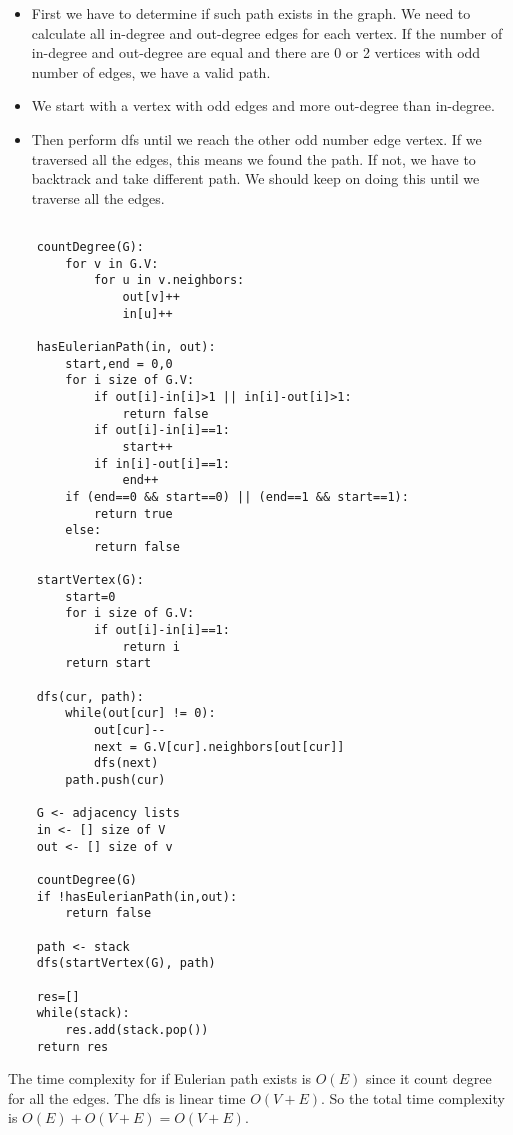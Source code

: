 \documentclass{article}
\begin{document}
\begin{enumerate}
  \begin{itemize}
    \item First we have to determine if such path exists in the graph.
    We need to calculate all in-degree and out-degree edges for each vertex.
    If the number of in-degree and out-degree are equal and there are 0 or 2 vertices with odd number of edges, we have a valid path.
    \item We start with a vertex with odd edges and more out-degree than in-degree.
    \item Then perform dfs until we reach the other odd number edge vertex.
    If we traversed all the edges, this means we found the path.
    If not, we have to backtrack and take different path.
    We should keep on doing this until we traverse all the edges.
  \end{itemize}

  \begin{lstlisting}

    countDegree(G):
        for v in G.V:
            for u in v.neighbors:
                out[v]++
                in[u]++
    
    hasEulerianPath(in, out):
        start,end = 0,0
        for i size of G.V:
            if out[i]-in[i]>1 || in[i]-out[i]>1:
                return false
            if out[i]-in[i]==1:
                start++
            if in[i]-out[i]==1:
                end++
        if (end==0 && start==0) || (end==1 && start==1):
            return true
        else:
            return false
    
    startVertex(G):
        start=0
        for i size of G.V:
            if out[i]-in[i]==1:
                return i
        return start

    dfs(cur, path):
        while(out[cur] != 0):
            out[cur]--
            next = G.V[cur].neighbors[out[cur]]
            dfs(next)
        path.push(cur)
        
    G <- adjacency lists
    in <- [] size of V
    out <- [] size of v

    countDegree(G)
    if !hasEulerianPath(in,out):
        return false
    
    path <- stack
    dfs(startVertex(G), path)

    res=[]
    while(stack):
        res.add(stack.pop())
    return res
  \end{lstlisting}

  The time complexity for if Eulerian path exists is $O(E)$ since it count degree for all the edges.
  The dfs is linear time $O(V+E)$.
  So the total time complexity is $O(E)+O(V+E)=O(V+E)$.

\end{enumerate}
\end{document}
